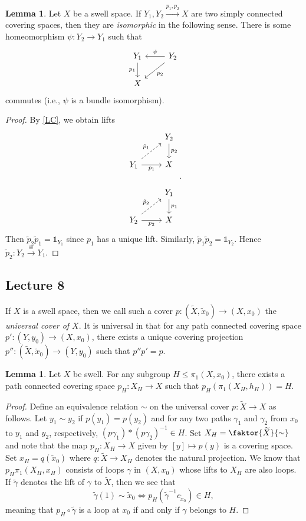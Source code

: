 \documentclass[10pt,letterpaper,cm]{nupset}
\theoremstyle{definition}
\theoremstyle{theorem}
\newtheorem{lemma}[definition]{Lemma}
\theoremstyle{remark}
\newcommand{\1}{\mathbb{1}}
\newcommand{\0}{\vec 0}
\begin{document}
\begin{lemma}
Let $X$ be a swell space.  If $Y_1, Y_2 \overset{p_1, p_2}{\longrightarrow} X$ are two simply connected covering spaces, then they are \textit{isomorphic} in the following sense. There is some homeomorphism $\psi : Y_2 \to Y_1$ such that 
\[
\begin{tikzcd}
Y_1 \arrow[d, "p_1"'] & Y_2 \arrow[ld, "p_2"] \arrow[l, "\psi"'] \\
X & 
\end{tikzcd}
\] commutes (i.e., $\psi$ is a bundle isomorphism).
\end{lemma}
\begin{proof}
By \cref{LC}, we obtain lifts
\[
\begin{tikzcd}
 & Y_2 \arrow[d, "p_2"] \\
Y_1 \arrow[r, "p_1"'] \arrow[ru, "\tilde{p}_1", dashed] & X \\
 & Y_1 \arrow[d, "p_1"] \\
Y_2 \arrow[r, "p_2"'] \arrow[ru, "\tilde{p}_2", dashed] & X
\end{tikzcd}.
\] Then $\tilde{p}_2\tilde{p}_1 = \1_{Y_1}$ since $p_1$ has a unique lift. Similarly, $\tilde{p}_1\tilde{p}_2 = \1_{Y_2}$. Hence $\tilde{p}_2 : Y_2 \overset{\cong}{\longrightarrow} Y_1.$ 
\end{proof}

\subsection{Lecture 8}


If $X$ is a swell space, then we call such a cover $p: \left(\widetilde{X}, \tilde{x}_0\right) \to \left(X, x_0\right)$ the \textit{universal cover of $X$}. It is universal in that for any path connected covering space $p': \left(Y, y_0\right) \to \left(X, x_0\right)$, there exists a unique covering projection $p'': \left(\widetilde{X}, \tilde{x}_0\right) \to \left(Y, y_0\right)$ such that $p'' p' = p$. 


\begin{lemma}
Let $X$ be swell. For any subgroup $H \leq \pi_1\left(X, x_0\right)$, there exists a path connected covering space $p_H : X_H \to X$ such that $p_H (\pi_1(X_H, h_H)) = H$.
\end{lemma}
\begin{proof}
Define an equivalence relation $\sim$ on the universal cover $p: \widetilde{X} \to X$ as follows. Let $y_1 \sim y_2$ if $p(y_1) = p(y_2)$ and for any two paths $\gamma_1$ and $\gamma_2$ from $x_0$ to $y_1$ and $y_2$, respectively, $(p\gamma_1)\ast (p\gamma_2)^{-1}\in H$. Set $X_H = \faktor{\widetilde{X}}{\sim}$ and note that the map $p_H : X_H \to X$ given by $[y] \mapsto p(y)$ is a covering space. Set $x_H= q(\tilde{x}_0)$ where $q: \widetilde{X} \to X_H$ denotes the natural projection. We know that $p_H \pi_1(X_H, x_H)$ consists of loops $\gamma$ in $\left(X, x_0\right)$ whose lifts to $X_H$ are also loops.  If $\tilde{\gamma}$ denotes the lift of $\gamma$ to $\widetilde{X}$, then we see that $$\tilde{\gamma}(1) \sim \tilde{x}_0 \iff p_H(\tilde{\gamma}^{-1} c_{\tilde{x} _0}) \in H,$$ meaning that  $p_H \circ \tilde{\gamma}$ is a loop at $x_0$ if and only if $\gamma$ belongs to $H$.
\end{proof}
\end{document}
